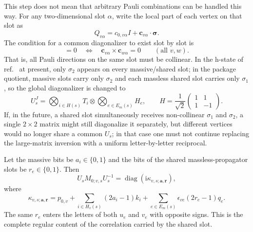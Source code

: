 \documentclass[11pt,a4paper]{article}
\newcommand{\ii}{\mathrm i}
\begin{document}
This step does not mean that arbitrary Pauli combinations can be handled this way. For any two-dimensional slot $\alpha$, write the local part of each vertex on that slot as
\begin{equation}
 Q_{v\alpha}=c_{0,v\alpha}I+\bm c_{v\alpha}\cdot\bm\sigma.
\end{equation}
The condition for a common diagonalizer to exist slot by slot is
\begin{equation}
 [Q_{v\alpha},Q_{w\alpha}]=0
 \quad\Longleftrightarrow\quad
 \bm c_{v\alpha}\times\bm c_{w\alpha}=0
 \qquad(\text{all }v,w).
 \label{eq:local-common-diagonalization-condition}
\end{equation}
That is, all Pauli directions on the same slot must be collinear. In the h-state of ref.~\cite{Chen:2023eic} at present, only $\sigma_2$ appears on every massive/shared slot; in the package quotient, massive slots carry only $\sigma_2$ and each massless shared slot carries only $\sigma_1$, so the global diagonalizer is changed to
\begin{equation}
 U_s^J
 =\bigotimes_{i\in H(s)}T_i
 \otimes\bigotimes_{e\in E_m(s)}H_e,
 \qquad
 H=\frac1{\sqrt2}\begin{pmatrix}1&1\\1&-1\end{pmatrix}.
 \label{eq:package-global-diagonalizer}
\end{equation}
If, in the future, a shared slot simultaneously receives non-collinear $\sigma_1$ and $\sigma_2$, a single $2\times2$ matrix might still diagonalize it separately, but different vertices would no longer share a common $U_s$; in that case one must not continue replacing the large-matrix inversion with a uniform letter-by-letter reciprocal.

Let the massive bits be $a_i\in\{0,1\}$ and the bits of the shared massless-propagator slots be $r_e\in\{0,1\}$. Then
\begin{equation}
 U_sM_{0;v,s}U_s^{-1}
 =\operatorname{diag}\!\left(\ii\kappa_{v,s;\bm a,\bm r}\right),
 \label{eq:global-M0-diagonal}
\end{equation}
where
\begin{equation}
 \boxed{
 \kappa_{v,s;\bm a,\bm r}
 =p_{0,v}
 +\sum_{i\in H_v(s)}(2a_i-1)k_i
 +\sum_{e\in E_m(s)}
 \epsilon_{ve}(2r_e-1)q_e.
 }
 \label{eq:global-energy-letter}
\end{equation}
The same $r_e$ enters the letters of both $u_e$ and $v_e$ with opposite signs. This is the complete regular content of the correlation carried by the shared slot.
\end{document}
